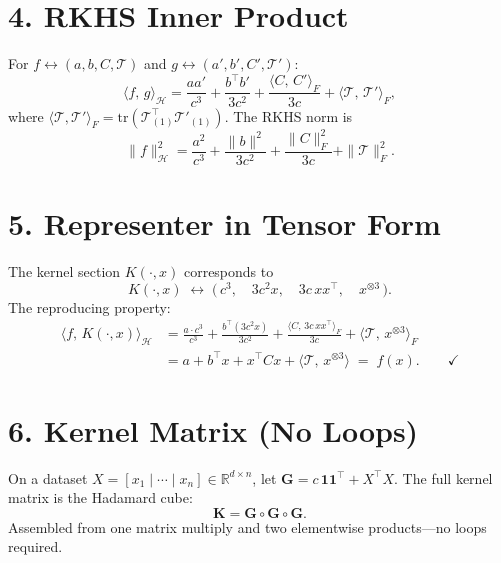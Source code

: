 \documentclass[11pt]{article}
\begin{document}
\section*{4. RKHS Inner Product}
 
For $f \leftrightarrow (a, b, C, \mathcal{T})$ and
$g \leftrightarrow (a', b', C', \mathcal{T}')$:
\[
  \boxed{
    \langle f,\, g \rangle_{\mathcal{H}}
    = \frac{aa'}{c^{3}}
    + \frac{b^\top b'}{3c^{2}}
    + \frac{\langle C,\, C' \rangle_{F}}{3c}
    + \langle \mathcal{T},\, \mathcal{T}' \rangle_{F},
  }
\]
where
$\langle \mathcal{T}, \mathcal{T}' \rangle_{F}
 = \mathrm{tr}(\mathcal{T}_{(1)}^\top \mathcal{T}'_{(1)})$.
The RKHS norm is
\[
  \| f \|_{\mathcal{H}}^{2}
  = \frac{a^{2}}{c^{3}}
  + \frac{\| b \|^{2}}{3c^{2}}
  + \frac{\| C \|_{F}^{2}}{3c}
  + \| \mathcal{T} \|_{F}^{2}.
\]
 
\section{5. Representer in Tensor Form}
 
The kernel section $K(\cdot, x)$ corresponds to
\[
  K(\cdot, x)
  \;\leftrightarrow\;
  \bigl(\,c^{3},\quad 3c^{2} x,\quad 3c\, xx^\top,\quad x^{\otimes 3}\,\bigr).
\]
The reproducing property:
\begin{align*}
  \langle f,\, K(\cdot, x) \rangle_{\mathcal{H}}
  &= \frac{a \cdot c^{3}}{c^{3}}
   + \frac{b^\top(3c^{2} x)}{3c^{2}}
   + \frac{\langle C,\, 3c\, xx^\top \rangle_{F}}{3c}
   + \langle \mathcal{T},\, x^{\otimes 3} \rangle_{F} \\[4pt]
  &= a + b^\top x + x^\top C x
   + \langle \mathcal{T},\, x^{\otimes 3} \rangle
   \;=\; f(x). \qquad \checkmark
\end{align*}
 
\section*{6. Kernel Matrix (No Loops)}
 
On a dataset $X = [x_{1} \mid \cdots \mid x_{n}]
\in \mathbb{R}^{d \times n}$, let
$\mathbf{G} = c\,\mathbf{1}\mathbf{1}^\top + X^\top X$.
The full kernel matrix is the Hadamard cube:
\[
  \boxed{\mathbf{K} = \mathbf{G} \circ \mathbf{G} \circ \mathbf{G}.}
\]
Assembled from one matrix multiply and two elementwise products---no
loops required.
 
\end{document}
